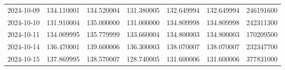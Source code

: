 \begin{tabular}{lrrrrrr}
2024-10-09 &  134.110001 &  134.520004 &  131.380005 &  132.649994 &  132.649994 &   246191600 \\
2024-10-10 &  131.910004 &  135.000000 &  131.000000 &  134.809998 &  134.809998 &   242311300 \\
2024-10-11 &  134.009995 &  135.779999 &  133.660004 &  134.800003 &  134.800003 &   170209500 \\
2024-10-14 &  136.470001 &  139.600006 &  136.300003 &  138.070007 &  138.070007 &   232347700 \\
2024-10-15 &  137.869995 &  138.570007 &  128.740005 &  131.600006 &  131.600006 &   377831000 \\
\bottomrule
\end{tabular}
